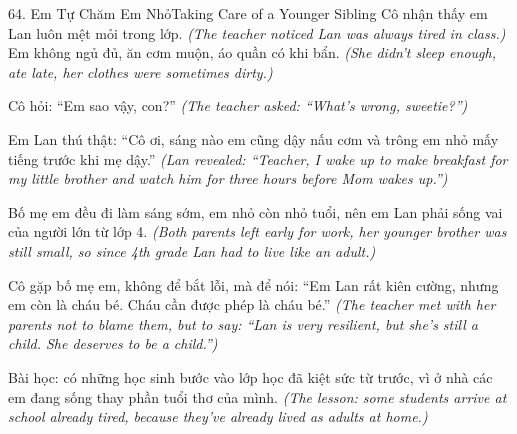 \begin{truyen}{64. Em Tự Chăm Em Nhỏ}{Taking Care of a Younger Sibling}
Cô nhận thấy em Lan luôn mệt mỏi trong lớp.
\textit{(The teacher noticed Lan was always tired in class.)}
Em không ngủ đủ, ăn cơm muộn, áo quần có khi bẩn.
\textit{(She didn't sleep enough, ate late, her clothes were sometimes dirty.)}

Cô hỏi: ``Em sao vậy, con?''
\textit{(The teacher asked: ``What's wrong, sweetie?'')}

Em Lan thú thật: ``Cô ơi, sáng nào em cũng dậy nấu cơm và trông em nhỏ mấy tiếng trước khi mẹ dậy.''
\textit{(Lan revealed: ``Teacher, I wake up to make breakfast for my little brother and watch him for three hours before Mom wakes up.'')}

Bố mẹ em đều đi làm sáng sớm, em nhỏ còn nhỏ tuổi, nên em Lan phải sống vai của người lớn từ lớp 4.
\textit{(Both parents left early for work, her younger brother was still small, so since 4th grade Lan had to live like an adult.)}

Cô gặp bố mẹ em, không để bắt lỗi, mà để nói: ``Em Lan rất kiên cường, nhưng em còn là cháu bé. Cháu cần được phép là cháu bé.''
\textit{(The teacher met with her parents not to blame them, but to say: ``Lan is very resilient, but she's still a child. She deserves to be a child.'')}

Bài học: có những học sinh bước vào lớp học đã kiệt sức từ trước, vì ở nhà các em đang sống thay phần tuổi thơ của mình.
\textit{(The lesson: some students arrive at school already tired, because they've already lived as adults at home.)}
\end{truyen}


